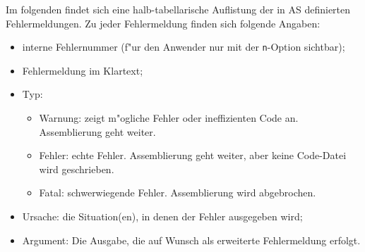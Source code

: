 \documentclass[12pt,a4paper,twoside]{report}
\newcommand{\tty}[1]{{\tt #1}}
\newcommand{\asname}{AS}
\begin{document}
Im folgenden findet sich eine halb-tabellarische Auflistung der in \asname{}
definierten Fehlermeldungen.  Zu jeder Fehlermeldung finden sich folgende
Angaben:
\begin{itemize}
\item{interne Fehlernummer (f"ur den Anwender nur mit der \tty{n}-Option sichtbar);}
\item{Fehlermeldung im Klartext;}
\item{Typ:
      \begin{itemize}
      \item{Warnung: zeigt m"ogliche Fehler oder ineffizienten Code an.
            Assemblierung geht weiter.}
      \item{Fehler: echte Fehler.  Assemblierung geht weiter, aber keine
            Code-Datei wird geschrieben.}
      \item{Fatal: schwerwiegende Fehler.  Assemblierung wird abgebrochen.}
      \end{itemize}}
\item{Ursache: die Situation(en), in denen der Fehler ausgegeben
      wird;}
\item{Argument: Die Ausgabe, die auf Wunsch als erweiterte Fehlermeldung
      erfolgt.}
\end{itemize}

\par

\newcommand{\errentry}[5]
           {\item[#1]{#2
                      \begin{description}
                      \item[Typ:]{\ \\#3}
                      \item[Ursache:]{\ \\#4}
                      \item[Argument:]{\ \\#5}
                      \end{description}}
           }
\end{document}
